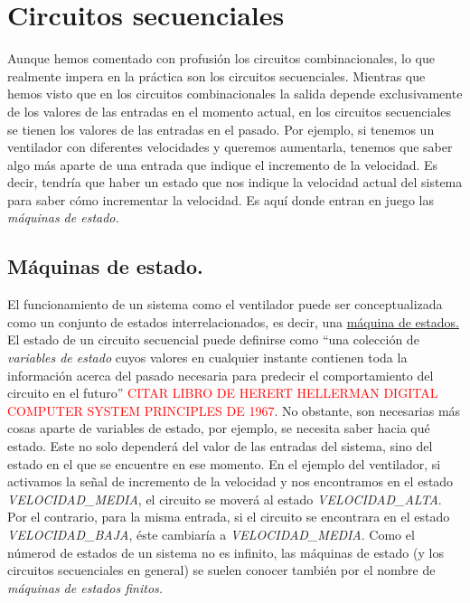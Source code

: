 \section{Circuitos secuenciales}

Aunque hemos comentado con profusión los circuitos combinacionales, lo que realmente impera en la práctica son los circuitos secuenciales. Mientras que hemos visto que en los circuitos combinacionales la salida depende exclusivamente de los valores de las entradas en el momento actual, en los circuitos secuenciales se tienen los valores de las entradas en el pasado. Por ejemplo, si tenemos un ventilador con diferentes velocidades y queremos aumentarla, tenemos que saber algo más aparte de una entrada que indique el incremento de la velocidad. Es decir, tendría que haber un estado que nos indique la velocidad actual del sistema para saber cómo incrementar la velocidad. Es aquí donde entran en juego las \emph{máquinas de estado.}

\subsection{Máquinas de estado.}

El funcionamiento de un sistema como el ventilador puede ser conceptualizada como un conjunto de estados interrelacionados, es decir, una \hyperlink{state-machine}{máquina de estados.} El estado de un circuito secuencial puede definirse como ``una colección de \emph{variables de estado} cuyos valores en cualquier instante contienen toda la información acerca del pasado necesaria para predecir el comportamiento del circuito en el futuro'' \textcolor{red}{CITAR LIBRO DE HERERT HELLERMAN DIGITAL COMPUTER SYSTEM PRINCIPLES DE 1967}. No obstante, son necesarias más cosas aparte de variables de estado, por ejemplo, se necesita saber hacia qué estado. Este no solo dependerá del valor de las entradas del sistema, sino del estado en el que se encuentre en ese momento. En el ejemplo del ventilador, si activamos la señal de incremento de la velocidad y nos encontramos en el estado \emph{VELOCIDAD\_MEDIA}, el circuito se moverá al estado \emph{VELOCIDAD\_ALTA}. Por el contrario, para la misma entrada, si el circuito se encontrara en el estado \emph{VELOCIDAD\_BAJA}, éste cambiaría a \emph{VELOCIDAD\_MEDIA}. Como el númerod de estados de un sistema no es infinito, las máquinas de estado (y los circuitos secuenciales en general) se suelen conocer también por el nombre de \emph{máquinas de estados finitos.}

